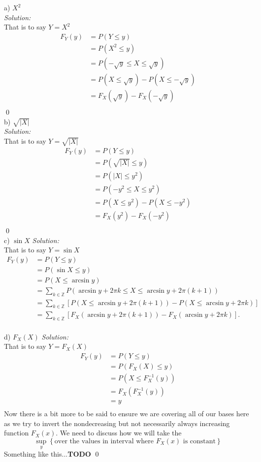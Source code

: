 \documentclass[10pt]{amsart}
\begin{document}
\noindent a) $X^2$ \\
\textit{Solution:} \\
That is to say $Y = X^2$
\begin{align*}
F_Y(y) &= P(Y \leq y) \\
	   &= P(X^2 \leq y) \\
	   &= P(-\sqrt{y} \leq X \leq \sqrt{y}) \\
	   &= P(X \leq \sqrt{y})  - P(X \leq -\sqrt{y}) \\
	   &= F_X(\sqrt{y})  - F_X(-\sqrt{y}) \\
\end{align*}
\qed
\\
\noindent b) $\sqrt{|X|}$ \\
\textit{Solution:} \\
That is to say $Y = \sqrt{|X|}$
\begin{align*}
F_Y(y) &= P(Y \leq y) \\
	   &= P(\sqrt{|X|} \leq y) \\
	   &= P(|X| \leq y^2) \\
	   &= P(-y^2 \leq X \leq y^2) \\
	   &= P(X \leq y^2)  - P(X \leq -y^2) \\
	   &= F_X(y^2)  - F_X(-y^2) \\
\end{align*}
\qed
\\
\noindent c) $\sin X$ \textit{Solution:} \\
That is to say $Y = \sin X$
\begin{align*}
F_Y(y) &= P(Y \leq y) \\
	   &= P(\sin X \leq y) \\
	   &= P( X \leq \arcsin y ) \\
	   &= \sum_{k \in \mathbb{Z}}P(\arcsin y + 2\pi k \leq X \leq \arcsin y + 2\pi (k + 1) ) \\
	   &= \sum_{k \in \mathbb{Z}} \left[ P(X \leq \arcsin y + 2\pi (k + 1) ) - P(X \leq \arcsin y + 2\pi k)\right] \\
	   &= \sum_{k \in \mathbb{Z}} \left[ F_X(\arcsin y + 2\pi (k + 1) ) - F_X(\arcsin y + 2\pi k)\right].
\end{align*}
\\
\noindent d) $F_X(X)$ \textit{Solution:} \\
That is to say $Y = F_X(X)$
\begin{align*}
F_Y(y) &= P(Y \leq y) \\
	   &= P(F_X(X) \leq y) \\
	   &= P(X \leq F_X^{-1}(y)) \\
	   &= F_X(F_X^{-1}(y)) \\
	   &= y \\
\end{align*}
Now there is a bit more to be said to ensure we are covering all of our bases here as we try to invert the nondecreasing but not necessarily always increasing function $F_X(x)$.
We need to discuss how we will take the \\
$$\sup_y \left\{\text{over the values in interval where $F_X(x)$ is constant}\right\}$$
Something like this...\textbf{TODO}
\qed
\\
\\
\end{document}
